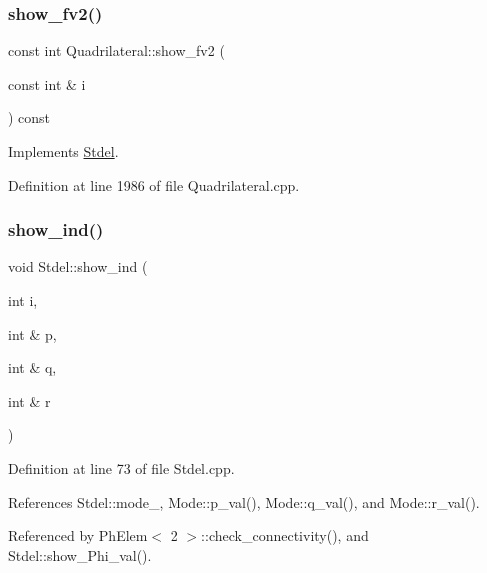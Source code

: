 \subsubsection{\texorpdfstring{show\+\_\+fv2()}{show\_fv2()}}
{\footnotesize\ttfamily const int Quadrilateral\+::show\+\_\+fv2 (\begin{DoxyParamCaption}\item[{const int \&}]{i }\end{DoxyParamCaption}) const\hspace{0.3cm}{\ttfamily [virtual]}}



Implements \hyperlink{classStdel_a67f16a65f02fc8a5aa10274539bd1ad8}{Stdel}.



Definition at line 1986 of file Quadrilateral.\+cpp.

\mbox{\label{classStdel_a20afd536025caf1aad1c4e3f41fcb866}} 
\subsubsection{\texorpdfstring{show\+\_\+ind()}{show\_ind()}}
{\footnotesize\ttfamily void Stdel\+::show\+\_\+ind (\begin{DoxyParamCaption}\item[{int}]{i,  }\item[{int \&}]{p,  }\item[{int \&}]{q,  }\item[{int \&}]{r }\end{DoxyParamCaption})\hspace{0.3cm}{\ttfamily [inherited]}}



Definition at line 73 of file Stdel.\+cpp.



References Stdel\+::mode\+\_\+, Mode\+::p\+\_\+val(), Mode\+::q\+\_\+val(), and Mode\+::r\+\_\+val().



Referenced by Ph\+Elem$<$ 2 $>$\+::check\+\_\+connectivity(), and Stdel\+::show\+\_\+\+Phi\+\_\+val().

